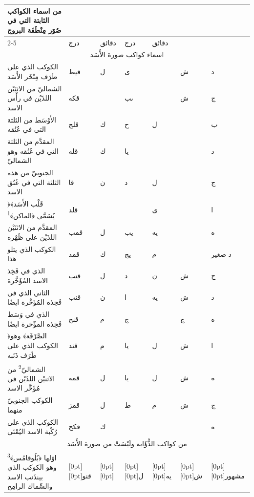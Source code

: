 \documentclass[11pt]{article}
\newcommand{\AbjadZero}{{\NallinoSigns\symbol{"E000}}}
\begin{document}
\begin{Arabic}\begin{tabular}{|p{84mm}|>{\centering\arraybackslash}p{9mm}|>{\centering\arraybackslash}p{9mm}|>{\centering\arraybackslash}p{9mm}|>{\centering\arraybackslash}p{9mm}|>{\centering\arraybackslash}p{14mm}|>{\centering\arraybackslash}p{17mm}|}\hline
\multirow{2}{*}{\parbox{80mm}{\centering من اسماء الكواكب الثابتة التي في صُوَر مِنْطَقَة البروج}} & \multicolumn{2}{c|}{الطول} & \multicolumn{2}{c|}{العرض} & \multirow{2}{*}{\parbox{13mm}{\centering\small علامات الجهة}} & \multirow{2}{*}{\parbox{16mm}{\centering\small مراتب العظمة}} \\ \cline{2-5}
 & {\small درج} & {\small دقائق} & {\small درج} & {\small دقائق} & & \\ \hline
\multicolumn{7}{|c|}{\large اسماء كواكب صورة الأَسَد} \\ \hline
الكوكب الذي على طَرَف مِنْخَر الأَسَد & قيط & ل & ى & \AbjadZero{} & ش & د \\
الشماليّ من الاثنَيْن اللذَيْن في رأْس الاسد & قكه & \AbjadZero{} & ىب & \AbjadZero{} & ش & ج \\
الأَوْسَط من الثلثة التي في عُنُقه & قلج & ك & ح & ل &  & ب \\
المقدَّم من الثلثة التي في عُنُقه وهو الشماليّ & قله & ك & يا & \AbjadZero{} &  & د \\
الجنوبيّ من هذه الثلثة التي في عُنُق الاسد & قا & ن & د & ل &  & ج \\
﴿قَلْب الأَسَد﴾ يُسَمَّى ﴿الماكن﴾\textsuperscript{1} & قلد & \AbjadZero{} & \AbjadZero{} & ى &  & ا \\
المقدَّم من الاثنَيْن اللذَيْن على ظَهْره & قمب & ل & يب & يه &  & ه \\
الكوكب الذي يتلو هذا & قمد & ك & يج & م &  & د صغير \\
الذي في فَخِذ الاسد المُؤَخَّرة & قنب & ل & د & ن & ش & ج \\
الثاني الذي في فَخِذه المُؤَخَّرة ايضًا & قنب & ن & ا & يه & ش & د \\
الذي في وَسَط فَخِذه المؤّخرة ايضًا & قنح & م & ج & \AbjadZero{} & ج & ه \\
﴿الصَّرْفَة﴾ وهو الكوكب الذي على طَرَف ذَنَبه & قند & م & يا & ل & ش & ا \\
الشماليّ\textsuperscript{2} من الاثنيْن اللذَيْن في مُؤَخَّر الاسد & قمه & ل & يا & ل & ش & ه \\
الكوكب الجنوبيّ منهما & قمز & ل & ط & م & ش & ج \\
الكوكب الذي على رُكْبة الاسد اليُمْنَى & قكح & ك & \AbjadZero{} & \AbjadZero{} & \AbjadZero{} & ه \\
\hline
\multicolumn{7}{|c|}{\large من كواكب الذُّؤَابة ولَيْسَتْ من صورة الأَسَد} \\ \hline
اوّلها ﴿بُلُوقامُس﴾\textsuperscript{3} وهو الكوكب الذي بين\newline ذَنب الاسد والسِّماك الرامِح & \raisebox{-1\normalbaselineskip}[0pt][0pt]{قنو} & \raisebox{-1\normalbaselineskip}[0pt][0pt]{\AbjadZero{}} & \raisebox{-1\normalbaselineskip}[0pt][0pt]{ل} & \raisebox{-1\normalbaselineskip}[0pt][0pt]{يه} & \raisebox{-1\normalbaselineskip}[0pt][0pt]{ش} & \raisebox{-1\normalbaselineskip}[0pt][0pt]{مشهور} \\
\hline
\end{tabular}\end{Arabic}
\end{document}
